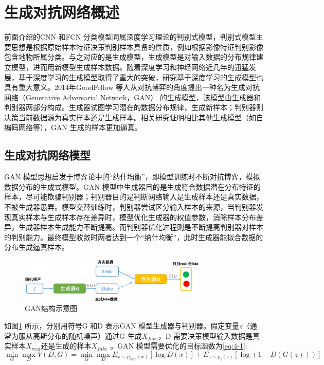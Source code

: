 \section{生成对抗网络概述}
\label{sec:chap02-3}
前面介绍的CNN 和FCN 分类模型同属深度学习理论的判别式模型，判别式模型主要思想是根据原始样本特征决策判别样本具备的性质，例如根据影像特征判别影像包含地物所属分类。与之对应的是生成模型，生成模型是对输入数据的分布规律建立模型，进而用新模型生成样本数据。随着深度学习和神经网络近几年的迅猛发展，基于深度学习的生成模型取得了重大的突破，研究基于深度学习的生成模型也具有重大意义。2014年GoodFellow 等人从对抗博弈的角度提出一种名为生成对抗网络（Generative Adversarial Network，GAN）\cite{goodfellow2014generative} 的生成模型，该模型由生成器和判别器两部分构成。生成器试图学习潜在的数据分布规律，生成新样本；判别器则决策当前数据源为真实样本还是生成样本。相关研究\cite{mirza2014conditional}证明相比其他生成模型（如自编码网络等），GAN 生成的样本更加逼真。 

\subsection{生成对抗网络模型}
\label{sec:first-1}
GAN 模型思想启发于博弈论中的“纳什均衡”，即模型训练时不断对抗博弈，模拟数据分布的生成式模型。GAN 模型中生成器目的是生成符合数据潜在分布特征的样本，尽可能欺骗判别器；判别器目的是判断网络输入是生成样本还是真实数据，不被生成器愚弄。模型交替训练时，判别器尝试区分输入样本的来源，当判别器发现真实样本与生成样本存在差异时，模型优化生成器的权值参数，消除样本分布差异，生成器样本生成能力不断提高。而判别器优化过程则是不断提高判别器对样本的判别能力。最终模型收敛时两者达到一个“纳什均衡”，此时生成器能拟合数据的分布生成逼真样本。

\begin{figure}[htb]
  \centering
  \includegraphics[width=0.8\textwidth]{figures/gan}
  \caption{GAN结构示意图}\label{fig:gan}
\end{figure}

如图\ref{fig:gan} 所示，分别用符号G 和D 表示GAN 模型生成器与判别器。假定变量$z$（通常为服从高斯分布的随机噪声）通过G 生成$X_{fake}$，D 需要决策模型输入数据是真实样本$X_{real}$还是生成的样本$X_{fake}$ 。GAN 模型需要优化的目标函数为\ref{eq:4-1}:
\begin{equation}
  \label{eq:4-1}
  \mathop{\min}_{G} \mathop{\max}_{D} V(D,G) = \mathop{\min}_{G} \mathop{\max}_{D} E_{x \sim p_{data}(x)} [\log D(x)] + E_{z \sim p_{z}(z)}[ \log (1-D(G(z)))]
\end{equation}

